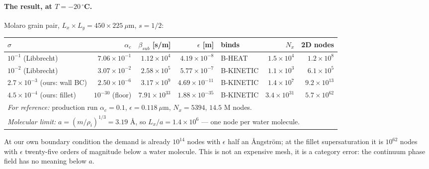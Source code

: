 \paragraph{The result, at $T = -20\,^\circ$C.}
Molaro grain pair, $L_x \times L_y = 450 \times 225\ \mu$m, $s = 1/2$:
%
\begin{center}\footnotesize
\begin{tabular}{lrrrlrr}
\hline
$\sigma$ & $\alpha_c$ & $\beta_{sub}$ [s/m] & $\epsilon$ [m] & binds
  & $N_x$ & 2D nodes \\
\hline
$10^{-1}$ (Libbrecht) & $7.06\times10^{-1}$ & $1.12\times10^{4}$
  & $4.19\times10^{-8}$  & B-HEAT    & $1.5\times10^{4}$  & $1.2\times10^{8}$ \\
$10^{-2}$ (Libbrecht) & $3.07\times10^{-2}$ & $2.58\times10^{5}$
  & $5.77\times10^{-7}$  & B-KINETIC & $1.1\times10^{3}$  & $6.1\times10^{5}$ \\
$2.7\times10^{-3}$ (ours: wall BC) & $2.50\times10^{-6}$ & $3.17\times10^{9}$
  & $4.69\times10^{-11}$ & B-KINETIC & $1.4\times10^{7}$  & $9.2\times10^{13}$ \\
$4.5\times10^{-4}$ (ours: fillet) & $10^{-30}$ (floor) & $7.91\times10^{33}$
  & $1.88\times10^{-35}$ & B-KINETIC & $3.4\times10^{31}$ & $5.7\times10^{62}$ \\
\hline
\multicolumn{7}{l}{\emph{For reference:} production run $\alpha_c = 0.1$,
  $\epsilon = 0.118\ \mu$m, $N_x = 5394$, $14.5$ M nodes.}\\
\multicolumn{7}{l}{\emph{Molecular limit:} $a = (m/\rho_i)^{1/3} = 3.19$ \AA,
  so $L_x/a = 1.4\times10^{6}$ --- one node per water molecule.}\\
\hline
\end{tabular}
\end{center}
%
At our own boundary condition the demand is already $10^{14}$ nodes with
$\epsilon$ half an \AA ngstr\"om; at the fillet supersaturation it is
$10^{62}$ nodes with $\epsilon$ twenty-five orders of magnitude below a water
molecule. This is not an expensive mesh, it is a category error: the
continuum phase field has no meaning below $a$.

